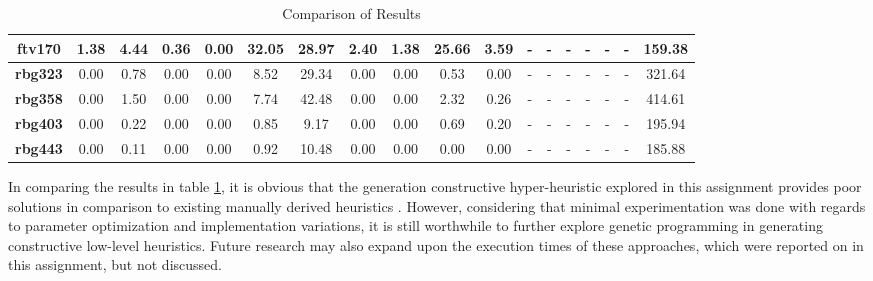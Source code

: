 \begin{table}[H]
{\begin{tabular}{|c|c|c|c|c|c|c|c|c|c|c|c|c|c|c|c|c|c|}
\textbf{ftv170}           & 1.38       & 4.44        & 0.36       & 0.00       & 32.05       & 28.97       & 2.40         & 1.38         & 25.66        & 3.59         & -           & -           & -           & -           & -            & -            & 159.38      \\ \hline
\textbf{rbg323}           & 0.00       & 0.78        & 0.00       & 0.00       & 8.52        & 29.34       & 0.00         & 0.00         & 0.53         & 0.00         & -           & -           & -           & -           & -            & -            & 321.64      \\ \hline
\textbf{rbg358}           & 0.00       & 1.50        & 0.00       & 0.00       & 7.74        & 42.48       & 0.00         & 0.00         & 2.32         & 0.26         & -           & -           & -           & -           & -            & -            & 414.61      \\ \hline
\textbf{rbg403}           & 0.00       & 0.22        & 0.00       & 0.00       & 0.85        & 9.17        & 0.00         & 0.00         & 0.69         & 0.20         & -           & -           & -           & -           & -            & -            & 195.94      \\ \hline
\textbf{rbg443}           & 0.00       & 0.11        & 0.00       & 0.00       & 0.92        & 10.48       & 0.00         & 0.00         & 0.00         & 0.00         & -           & -           & -           & -           & -            & -            & 185.88      \\ \hline
\end{tabular}}
\caption{Comparison of Results}
\label{tab:test_comparison}
\end{table}

In comparing the results in table \ref{tab:test_comparison}, it is obvious that the generation constructive hyper-heuristic explored in this assignment provides poor solutions in comparison to existing manually derived heuristics . However, considering that minimal experimentation was done with regards to parameter optimization and implementation variations, it is still worthwhile to further explore genetic programming in generating constructive low-level heuristics. Future research may also expand upon the execution times of these approaches, which were reported on in this assignment, but not discussed.